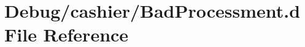 \hypertarget{BadProcessment_8d}{\section{Debug/cashier/\-Bad\-Processment.d File Reference}
\label{BadProcessment_8d}
}
